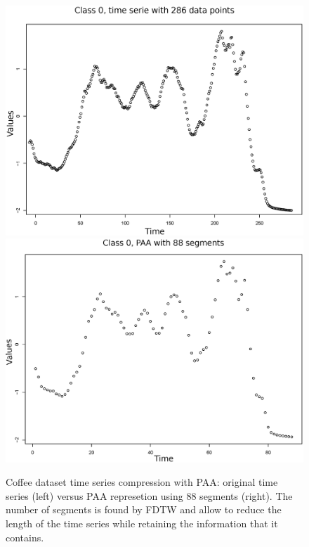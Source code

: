 \begin{figure}
\center
\includegraphics[scale=0.18]{images/coffee_0_ts}
\includegraphics[scale=0.18]{images/coffee_0_paa_88}


\caption{Coffee dataset time series compression with PAA: original time series
(left) versus PAA represetion using 88 segments (right). The number of segments
is found by FDTW and allow to reduce the length of the time series while retaining the information that it contains.}

\label{coffee}
\end{figure}



